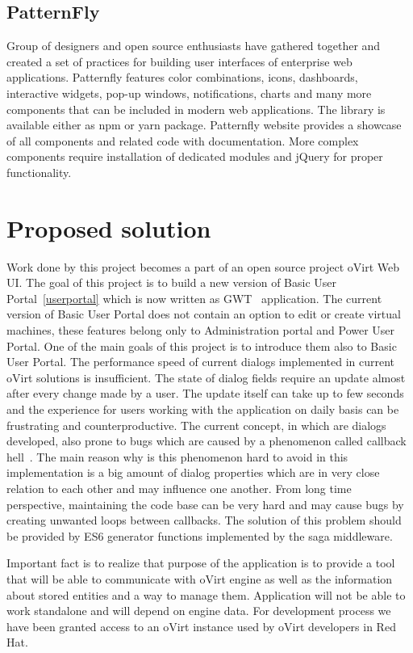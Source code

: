 \section{PatternFly}
Group of designers and open source enthusiasts have gathered together and created a set of practices for building user interfaces of enterprise web applications. Patternfly features color combinations, icons, dashboards, interactive widgets, pop-up windows, notifications, charts and many more components that can be included in modern web applications. The library is available either as npm \cite{npm} or yarn \cite{yarn} package. Patternfly website \cite{Patternfly} provides a showcase of all components and related code with documentation. More complex components require installation of dedicated modules and jQuery for proper functionality.

\chapter{Proposed solution}
Work done by this project becomes a part of an open source project oVirt Web UI. The goal of this project is to build a new version of Basic User Portal~\ref{userportal} which is now written as GWT~\cite{gwt} application.
The current version of Basic User Portal does not contain an option to edit or create virtual machines, these features belong only to Administration portal and Power User Portal. One of the main goals of this project is to introduce them also to Basic User Portal.
The performance speed of current dialogs implemented in current oVirt solutions is insufficient. The state of dialog fields require an update almost after every change made by a user. The update itself can take up to few seconds and the experience for users working with the application on daily basis can be frustrating and counterproductive. 
The current concept, in which are dialogs developed, also prone to bugs which are caused by a phenomenon called callback hell~\cite{callback_hell}. The main reason why is this phenomenon hard to avoid in this implementation is a big amount of dialog properties which are in very close relation to each other and may influence one another. From long time perspective, maintaining the code base can be very hard and may cause bugs by creating unwanted loops between callbacks. The solution of this problem should be provided by ES6 generator functions implemented by the saga middleware.

Important fact is to realize that purpose of the application is to provide a tool that will be able to communicate with oVirt engine as well as the information about stored entities and a way to manage them. Application will not be able to work standalone and will depend on engine data. For development process we have been granted access to an oVirt instance used by oVirt developers in Red Hat.  

